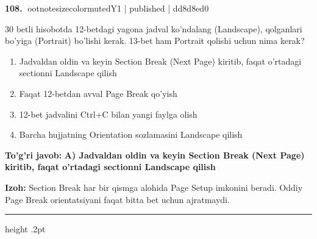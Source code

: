 \documentclass[10pt,a4paper]{article}
\begin{document}
\textbf{\color{ink}108.} {ootnotesizecolor{muted}Y1 | published | dd8d8ed0}
\par
30 betli hisobotda 12-betdagi yagona jadval ko'ndalang (Landscape), qolganlari bo'yiga (Portrait) bo'lishi kerak. 13-bet ham Portrait qolishi uchun nima kerak?
\begin{enumerate}[label=\Alph*),leftmargin=9mm]
\item Jadvaldan oldin va keyin Section Break (Next Page) kiritib, faqat o'rtadagi sectionni Landscape qilish
\item Faqat 12-betdan avval Page Break qo'yish
\item 12-bet jadvalini Ctrl+C bilan yangi faylga olish
\item Barcha hujjatning Orientation sozlamasini Landscape qilish
\end{enumerate}
\begin{tcolorbox}[enhanced,breakable,colback=teal!4,colframe=teal!55!black,boxrule=0.45pt,arc=1.2mm,left=2.8mm,right=2.8mm,top=2mm,bottom=2mm]
\textbf{\color{teal}To'g'ri javob:} \textbf{A) Jadvaldan oldin va keyin Section Break (Next Page) kiritib, faqat o'rtadagi sectionni Landscape qilish}
\par\smallskip
\textbf{Izoh:} Section Break har bir qismga alohida Page Setup imkonini beradi. Oddiy Page Break orientatsiyani faqat bitta bet uchun ajratmaydi.
\end{tcolorbox}
\vspace{2mm}\hrule height .2pt\vspace{2mm}
\end{document}
